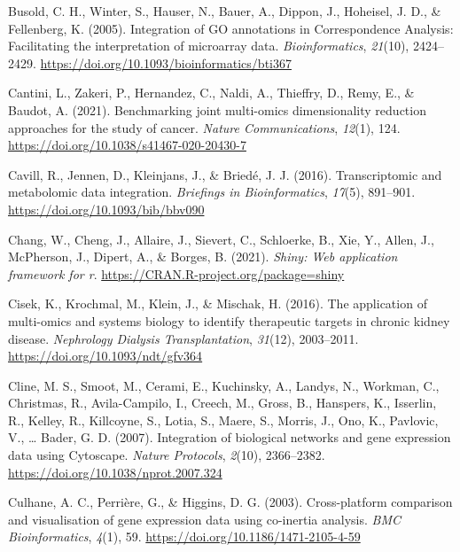 \documentclass[a4paper, nobind]{templates/ociamthesis}
\newlength{\cslhangindent}
\newenvironment{CSLReferences}[2] %
 {%
  \setlength{\parindent}{0pt}
  \ifodd #1
  \let\oldpar\par
  \def\par{\hangindent=\cslhangindent\oldpar}
  \fi
  \setlength{\parskip}{1mm}
  \setlength{\baselineskip}{6mm}
 }%
 {}
\begin{document}
\begin{CSLReferences}{1}{0}
\leavevmode{}%
Busold, C. H., Winter, S., Hauser, N., Bauer, A., Dippon, J., Hoheisel, J. D., \& Fellenberg, K. (2005). Integration of {GO} annotations in {Correspondence} {Analysis}: Facilitating the interpretation of microarray data. \emph{Bioinformatics}, \emph{21}(10), 2424--2429. \url{https://doi.org/10.1093/bioinformatics/bti367}

\leavevmode{}%
Cantini, L., Zakeri, P., Hernandez, C., Naldi, A., Thieffry, D., Remy, E., \& Baudot, A. (2021). Benchmarking joint multi-omics dimensionality reduction approaches for the study of cancer. \emph{Nature Communications}, \emph{12}(1), 124. \url{https://doi.org/10.1038/s41467-020-20430-7}

\leavevmode{}%
Cavill, R., Jennen, D., Kleinjans, J., \& Briedé, J. J. (2016). Transcriptomic and metabolomic data integration. \emph{Briefings in Bioinformatics}, \emph{17}(5), 891--901. \url{https://doi.org/10.1093/bib/bbv090}

\leavevmode{}%
Chang, W., Cheng, J., Allaire, J., Sievert, C., Schloerke, B., Xie, Y., Allen, J., McPherson, J., Dipert, A., \& Borges, B. (2021). \emph{Shiny: Web application framework for r}. \url{https://CRAN.R-project.org/package=shiny}

\leavevmode{}%
Cisek, K., Krochmal, M., Klein, J., \& Mischak, H. (2016). The application of multi-omics and systems biology to identify therapeutic targets in chronic kidney disease. \emph{Nephrology Dialysis Transplantation}, \emph{31}(12), 2003--2011. \url{https://doi.org/10.1093/ndt/gfv364}

\leavevmode{}%
Cline, M. S., Smoot, M., Cerami, E., Kuchinsky, A., Landys, N., Workman, C., Christmas, R., Avila-Campilo, I., Creech, M., Gross, B., Hanspers, K., Isserlin, R., Kelley, R., Killcoyne, S., Lotia, S., Maere, S., Morris, J., Ono, K., Pavlovic, V., \ldots{} Bader, G. D. (2007). Integration of biological networks and gene expression data using {Cytoscape}. \emph{Nature Protocols}, \emph{2}(10), 2366--2382. \url{https://doi.org/10.1038/nprot.2007.324}

\leavevmode{}%
Culhane, A. C., Perrière, G., \& Higgins, D. G. (2003). Cross-platform comparison and visualisation of gene expression data using co-inertia analysis. \emph{BMC Bioinformatics}, \emph{4}(1), 59. \url{https://doi.org/10.1186/1471-2105-4-59}


\end{CSLReferences}
\end{document}

